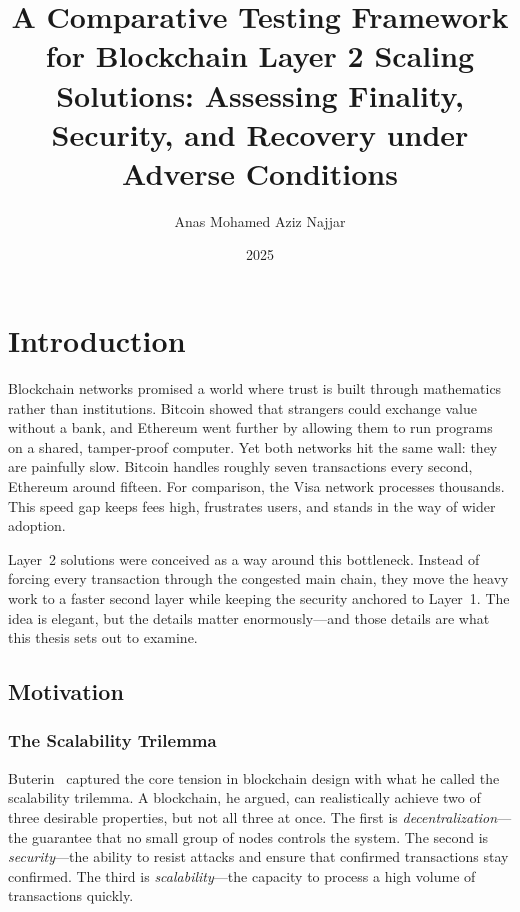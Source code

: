 \documentclass[
]{elteikthesis}[2024/04/26]
\title{A Comparative Testing Framework for Blockchain Layer 2 Scaling Solutions: Assessing Finality, Security, and Recovery under Adverse Conditions} %
\date{2025} %
\author{Anas Mohamed Aziz Najjar}
\affiliation{Associate Professor} %
\begin{document}

\listoftodos[\todolabel]

\maketitle

\tableofcontents
\cleardoublepage

\chapter{Introduction}
\label{ch:intro}

Blockchain networks promised a world where trust is built through mathematics rather than institutions. Bitcoin showed that strangers could exchange value without a bank, and Ethereum went further by allowing them to run programs on a shared, tamper-proof computer. Yet both networks hit the same wall: they are painfully slow. Bitcoin handles roughly seven transactions every second, Ethereum around fifteen. For comparison, the Visa network processes thousands. This speed gap keeps fees high, frustrates users, and stands in the way of wider adoption.

Layer~2 solutions were conceived as a way around this bottleneck. Instead of forcing every transaction through the congested main chain, they move the heavy work to a faster second layer while keeping the security anchored to Layer~1. The idea is elegant, but the details matter enormously---and those details are what this thesis sets out to examine.

\section{Motivation}

\subsection{The Scalability Trilemma}

Buterin~\cite{scalability-trilemma} captured the core tension in blockchain design with what he called the scalability trilemma. A blockchain, he argued, can realistically achieve two of three desirable properties, but not all three at once. The first is \textit{decentralization}---the guarantee that no small group of nodes controls the system. The second is \textit{security}---the ability to resist attacks and ensure that confirmed transactions stay confirmed. The third is \textit{scalability}---the capacity to process a high volume of transactions quickly.
\end{document}

